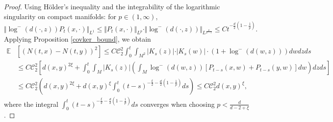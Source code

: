\documentclass[12pt]{amsart}
\numberwithin{equation}{section}
\newcommand{\1}{\mathbf{1}}
\begin{document}
\begin{proof}
Using H\"older's inequality and the integrability of the logarithmic singularity on compact manifolds: for $p \in (1,\infty)$,
\begin{equation*}
        \Vert\log^-(d(\cdot,z))P_t(x,\cdot)\Vert_{L^1}\leq\Vert P_t(x,\cdot)\Vert_{L^p}\cdot\Vert \log^-(d(\cdot,z))\Vert_{L^{\frac{p}{p-1}}}\leq Ct^{-\frac{d}{2}(1-\frac{1}{p})}.
\end{equation*}
Applying Proposition \ref{covker_bound}, we obtain
\begin{equation*}
    \begin{split}
\mathbb{E}&\left[(N(t,x)-N(t,y))^2\right]\leq C\mathcal{C}_2^2
\int_0^t\int_{M^2}\vert K_s(z)\vert\cdot \vert K_s(w)\vert \cdot(1+\log^-(d(w,z))) dwdzds\\
&\leq C\mathcal{C}_2^2\left[d(x,y)^{2\xi}+\int_0^t\int_M\vert K_s(z)\vert \left(\int_M\log^-(d(w,z))[P_{t-s}(x,w)+P_{t-s}(y,w)] dw\right)dzds\right]\\
&\leq C\mathcal{C}_2^2\left(d(x,y)^{2\xi}+d(x,y)^{\xi}\int_0^t(t-s)^{-\frac{\xi}{2}-\frac{d}{2}(1-\frac{1}{p})}ds\right)\leq C\mathcal{C}_2^2d(x,y)^{\xi},
\end{split}
\end{equation*}
where the integral $\int_0^t(t-s)^{-\frac{\xi}{2}-\frac{d}{2}(1-\frac{1}{p})}ds$ converges when choosing $p<\frac{d}{d-2+\xi}$.


\end{proof}
\end{document}
